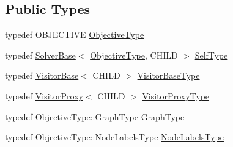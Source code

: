 \subsection*{Public Types}
\begin{DoxyCompactItemize}
\item 
typedef O\+B\+J\+E\+C\+T\+I\+V\+E \hyperlink{classnifty_1_1graph_1_1optimization_1_1common_1_1SolverBase_a28e77903302d3c14fa9fddb5d0a6214d}{Objective\+Type}
\item 
typedef \hyperlink{classnifty_1_1graph_1_1optimization_1_1common_1_1SolverBase}{Solver\+Base}$<$ \hyperlink{classnifty_1_1graph_1_1optimization_1_1common_1_1SolverBase_a28e77903302d3c14fa9fddb5d0a6214d}{Objective\+Type}, C\+H\+I\+L\+D $>$ \hyperlink{classnifty_1_1graph_1_1optimization_1_1common_1_1SolverBase_ae445fe93efdb410186debfa5a248dfad}{Self\+Type}
\item 
typedef \hyperlink{classnifty_1_1graph_1_1optimization_1_1common_1_1VisitorBase}{Visitor\+Base}$<$ C\+H\+I\+L\+D $>$ \hyperlink{classnifty_1_1graph_1_1optimization_1_1common_1_1SolverBase_a5a14d64c70a9cc0eebc7d71d2b089f9b}{Visitor\+Base\+Type}
\item 
typedef \hyperlink{classnifty_1_1graph_1_1optimization_1_1common_1_1VisitorProxy}{Visitor\+Proxy}$<$ C\+H\+I\+L\+D $>$ \hyperlink{classnifty_1_1graph_1_1optimization_1_1common_1_1SolverBase_a58913ea9ab9232ff72608b710c1012d0}{Visitor\+Proxy\+Type}
\item 
typedef Objective\+Type\+::\+Graph\+Type \hyperlink{classnifty_1_1graph_1_1optimization_1_1common_1_1SolverBase_a5b93d8c567c27949a944e908f59f8933}{Graph\+Type}
\item 
typedef Objective\+Type\+::\+Node\+Labels\+Type \hyperlink{classnifty_1_1graph_1_1optimization_1_1common_1_1SolverBase_a6e4e465f3b6e039882669fcfb9714818}{Node\+Labels\+Type}
\end{DoxyCompactItemize}
